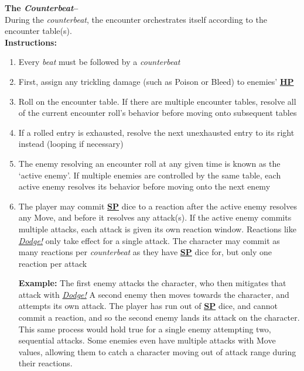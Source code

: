 \documentclass[12pt]{article}
\newcommand{\refto}[1]{\hyperlink{#1}{\textbf{#1}}}
\newcommand{\reftoit}[1]{\hyperlink{#1}{\emph{#1}}}
\begin{document}
\begin{multicols*}{2}
\textbf{The \emph{Counterbeat}--}\\
During the \emph{counterbeat}, the encounter orchestrates itself according to the encounter table(s).\\
\textbf{Instructions:}
\begin{enumerate}
\item Every \emph{beat} must be followed by a \emph{counterbeat}
\item First, assign any trickling damage (such as Poison or Bleed) to enemies’ \refto{HP}
\item Roll on the encounter table. If there are multiple encounter tables, resolve all of the current encounter roll’s behavior before moving onto subsequent tables
\item If a rolled entry is exhausted, resolve the next unexhausted entry to its right instead (looping if necessary)
\item The enemy resolving an encounter roll at any given time is known as the ‘active enemy’. If multiple enemies are controlled by the same table, each active enemy resolves its behavior before moving onto the next enemy
\item The player may commit \refto{SP} dice to a reaction after the active enemy resolves any Move, and before it resolves any attack(s). If the active enemy commits multiple attacks, each attack is given its own reaction window. Reactions like \reftoit{Dodge!} only take effect for a single attack. The character may commit as many reactions per \emph{counterbeat} as they have \refto{SP} dice for, but only one reaction per attack

\begin{tcolorbox}
\textbf{Example:} The first enemy attacks the character, who then mitigates that attack with \reftoit{Dodge!}\newline
A second enemy then moves towards the character, and attempts its own attack. The player has run out of \refto{SP} dice, and cannot commit a reaction, and so the second enemy lands its attack on the character.\newline
This same process would hold true for a single enemy attempting two, sequential attacks. Some enemies even have multiple attacks with Move values, allowing them to catch a character moving out of attack range during their reactions.
\end{tcolorbox}


\end{enumerate}
\end{multicols*}
\end{document}
